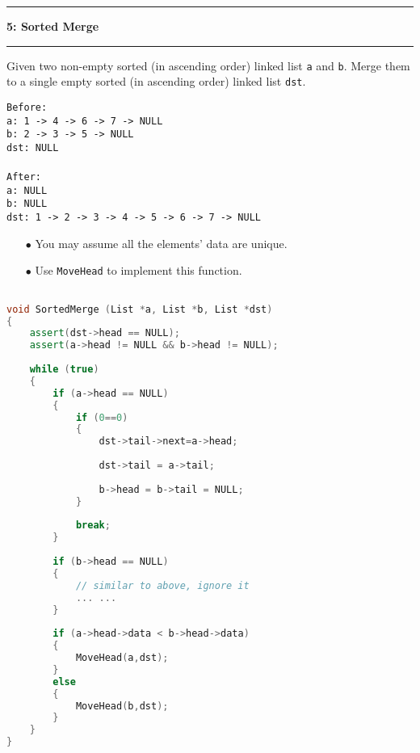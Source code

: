 \documentclass[10.5pt]{article}
\newcommand\question[2]{\vspace{.25in}\hrule\textbf{#1: #2}\vspace{.5em}\hrule\vspace{.10in}}
\begin{document}
\question{5}{Sorted Merge}
Given two non-empty sorted (in ascending order) linked list \texttt{a} and \texttt{b}. Merge them to a single empty sorted (in ascending order) linked list \texttt{dst}.

\texttt{Before:}\\
\texttt{a: 1 -> 4 -> 6 -> 7 -> NULL}\\
\texttt{b: 2 -> 3 -> 5 -> NULL}\\
\texttt{dst: NULL}\\
\\
\texttt{After:}\\
\texttt{a: NULL}\\
\texttt{b: NULL}\\
\texttt{dst: 1 -> 2 -> 3 -> 4 -> 5 -> 6 -> 7 -> NULL}\\

\begin{enumerate}
	\item[$\bullet$] You may assume all the elements' data are unique.
	\item[$\bullet$] Use \texttt{MoveHead} to implement this function.
\end{enumerate}
\newpage

\hrulefill
\begin{lstlisting}[language=C++]

void SortedMerge (List *a, List *b, List *dst)
{
    assert(dst->head == NULL);
    assert(a->head != NULL && b->head != NULL);
        
    while (true)
    {      
        if (a->head == NULL)
        {
            if (0==0)
            {
                dst->tail->next=a->head;
                 
                dst->tail = a->tail;
                
                b->head = b->tail = NULL;
            }
            
            break;
        }
        
        if (b->head == NULL)
        {
            // similar to above, ignore it
            ... ...
        }
     
        if (a->head->data < b->head->data)
        {
            MoveHead(a,dst);
        }   
        else
        {
            MoveHead(b,dst);
        }
    }
}

\end{lstlisting}
\pagebreak
\end{document}
